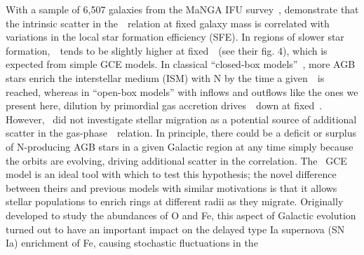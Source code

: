 \documentclass[ms.tex]{subfiles}
\begin{document}
With a sample of 6,507 galaxies from the MaNGA IFU survey~\citep{Bundy2015},
\citet{Schaefer2020} demonstrate that the intrinsic scatter in
the~\ohno~relation at fixed galaxy mass is correlated with variations in the
local star formation efficiency (SFE).
In regions of slower star formation,~\no~tends to be slightly higher at
fixed~\oh~(see their fig. 4), which is expected from simple GCE models.
In classical ``closed-box models''~\citep[e.g.][]{Molla2006}, more AGB stars
enrich the interstellar medium (ISM) with N by the time a given~\oh~is reached,
whereas in ``open-box models'' with inflows and outflows like the ones we
present here, dilution by primordial gas accretion drives~\oh~down at fixed~\no.
However,~\citet{Schaefer2020} did not investigate stellar migration as a
potential source of additional scatter in the gas-phase~\ohno~relation.
In principle, there could be a deficit or surplus of N-producing AGB stars in a
given Galactic region at any time simply because the orbits are evolving,
driving additional scatter in the correlation.
The~\citet{Johnson2021} GCE model is an ideal tool with which to test this
hypothesis; the novel difference between theirs and previous models with
similar motivations is that it allows stellar populations to enrich
rings at different radii as they migrate.
Originally developed to study the abundances of O and Fe, this aspect of
Galactic evolution turned out to have an important impact on the delayed type
Ia supernova (SN Ia) enrichment of Fe, causing stochastic fluctuations in the
\end{document}
